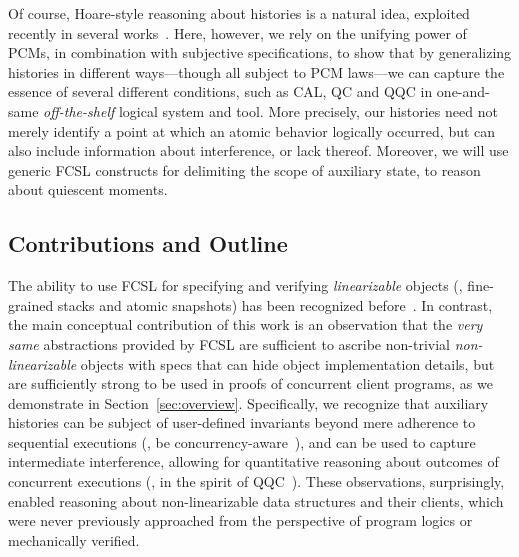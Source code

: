 Of course, Hoare-style reasoning about histories is a natural idea,
exploited recently in several
works~\cite{Fu-al:CONCUR10,Gotsman-al:ESOP13,Bell-al:SAS10,Hemed-al:DISC15}. Here,
however, we rely on the unifying power of PCMs, in combination with
subjective specifications, to show that by generalizing histories in
different ways---though all subject to PCM laws---we can capture the
essence of several different conditions, such as CAL, QC and QQC in
one-and-same \emph{off-the-shelf} logical system and tool.
%
More precisely, our histories need not merely identify a point at
which an atomic behavior logically occurred, but can also include
information about interference, or lack thereof. Moreover, we will use
generic FCSL constructs for delimiting the scope of auxiliary state,
to reason about quiescent moments.
%
%

\subsection{Contributions and Outline}
\label{sec:chall-contr}

The ability to use FCSL for specifying and verifying
\emph{linearizable} objects (\eg, fine-grained stacks and atomic
snapshots) has been recognized before~\cite{Sergey-al:ESOP15}.
%
In contrast, the main conceptual contribution of this work is an
observation that the \emph{very same} abstractions provided by FCSL
are sufficient to ascribe non-trivial \emph{non-linearizable} objects
with specs that can hide object implementation details, but are
sufficiently strong to be used in proofs of concurrent client
programs, as we demonstrate in Section~\ref{sec:overview}.
%
Specifically, we recognize that auxiliary histories can be subject of
user-defined invariants beyond mere adherence to sequential executions
(\eg, be concurrency-aware~\cite{Hemed-Rinetzky:PODC14}), and can be
used to capture intermediate interference, allowing for quantitative
reasoning about outcomes of concurrent executions (\eg, in the spirit
of QQC~\cite{Jagadeesan-Riely:ICALP14}). These observations,
surprisingly, enabled reasoning about non-linearizable data structures
and their clients, which were never previously approached from the
perspective of program logics or mechanically verified.

